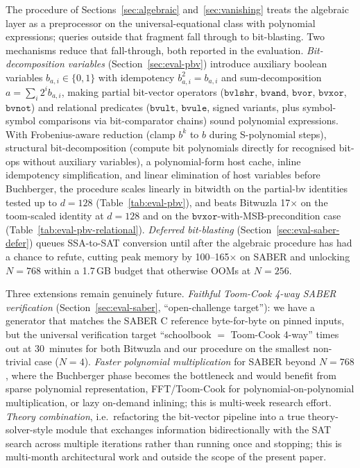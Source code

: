 \documentclass[runningheads]{llncs}
\begin{document}
The procedure of Sections~\ref{sec:algebraic} and~\ref{sec:vanishing}
treats the algebraic layer as a preprocessor on the
universal-equational class with polynomial expressions; queries
outside that fragment fall through to bit-blasting. Two
mechanisms reduce that fall-through, both reported in the
evaluation. \emph{Bit-decomposition variables}
(Section~\ref{sec:eval-pbv}) introduce auxiliary boolean
variables $b_{a,i} \in \{0, 1\}$ with idempotency
$b_{a,i}^2 = b_{a,i}$ and sum-decomposition
$a = \sum_i 2^i b_{a,i}$, making partial bit-vector operators
($\mathtt{bvlshr}$, $\mathtt{bvand}$, $\mathtt{bvor}$,
$\mathtt{bvxor}$, $\mathtt{bvnot}$) and relational predicates
($\mathtt{bvult}$, $\mathtt{bvule}$, signed variants, plus
symbol-symbol comparisons via bit-comparator chains) sound
polynomial expressions. With Frobenius-aware reduction (clamp
$b^k$ to $b$ during S-polynomial steps), structural
bit-decomposition (compute bit polynomials directly for
recognised bit-ops without auxiliary variables), a
polynomial-form host cache, inline idempotency simplification,
and linear elimination of host variables before Buchberger, the
procedure scales linearly in bitwidth on the partial-bv
identities tested up to $d = 128$
(Table~\ref{tab:eval-pbv}), and beats Bitwuzla 17$\times$ on
the toom-scaled identity at $d = 128$ and on the
$\mathtt{bvxor}$-with-MSB-precondition case
(Table~\ref{tab:eval-pbv-relational}).
\emph{Deferred bit-blasting} (Section~\ref{sec:eval-saber-defer})
queues SSA-to-SAT conversion until after the algebraic procedure
has had a chance to refute, cutting peak memory by 100--165$\times$
on SABER and unlocking $N = 768$ within a 1.7\,GB budget that
otherwise OOMs at $N = 256$.

Three extensions remain genuinely future. \emph{Faithful
Toom-Cook 4-way SABER verification}
(Section~\ref{sec:eval-saber}, ``open-challenge target''): we
have a generator that matches the SABER C reference byte-for-byte
on pinned inputs, but the universal verification target
``schoolbook $=$ Toom-Cook 4-way'' times out at 30~minutes for
both Bitwuzla and our procedure on the smallest non-trivial case
($N = 4$). \emph{Faster polynomial multiplication} for
SABER beyond $N = 768$, where the Buchberger phase becomes the
bottleneck and would benefit from sparse polynomial
representation, FFT/Toom-Cook for polynomial-on-polynomial
multiplication, or lazy on-demand inlining; this is multi-week
research effort. \emph{Theory combination}, i.e.\ refactoring
the bit-vector pipeline into a true theory-solver-style module
that exchanges information bidirectionally with the SAT search
across multiple iterations rather than running once and stopping;
this is multi-month architectural work and outside the scope
of the present paper.
\end{document}
